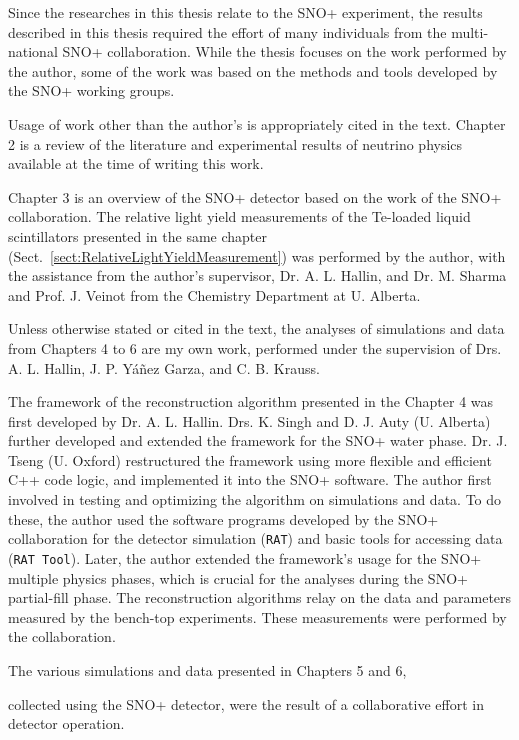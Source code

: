 Since the researches in this thesis relate to the SNO+ experiment, the results described in this thesis required the effort of many individuals from the multi-national SNO+ collaboration. While the thesis focuses on the work performed by the author, some of the work was based on the methods and tools developed by the SNO+ working groups. 

Usage of work other than the author's is appropriately cited in the text. Chapter 2 is a review of the literature and experimental results of neutrino physics available at the time of writing this work. 

Chapter 3 is an overview of the SNO+ detector based on the work of the SNO+ collaboration. The relative light yield measurements of the Te-loaded liquid scintillators presented in the same chapter (Sect.~\ref{sect:RelativeLightYieldMeasurement}) was performed by the author, with the assistance from the author's supervisor, Dr. A. L. Hallin, and Dr. M. Sharma and Prof. J. Veinot from the Chemistry Department at U. Alberta.

Unless otherwise stated or cited in the text, the analyses of simulations and data from Chapters 4 to 6 are my own work, performed under the supervision of Drs. A. L. Hallin, J. P. Y\'{a}\~{n}ez Garza, and C. B. Krauss. 

The framework of the reconstruction algorithm presented in the Chapter 4 was first developed by Dr. A. L. Hallin. Drs. K. Singh and D. J. Auty (U. Alberta) further developed and extended the framework for the SNO+ water phase. Dr. J. Tseng (U. Oxford) restructured the framework using more flexible and efficient C++ code logic, and implemented it into the SNO+ software. The author first involved in testing and optimizing the algorithm on simulations and data. To do these, the author used the software programs developed by the SNO+ collaboration for the detector simulation (\texttt{RAT}) and basic tools for accessing data (\texttt{RAT Tool}). Later, the author extended the framework's usage for the SNO+ multiple physics phases, which is crucial for the analyses during the SNO+ partial-fill phase. The reconstruction algorithms relay on the data and parameters measured by the bench-top experiments. These measurements were performed by the collaboration.

The various simulations and data presented in Chapters 5 and 6, 

collected using the SNO+
detector, were the result of a collaborative effort in detector operation. 


